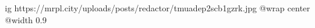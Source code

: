  
 
 
 
 

\ifcmt
  ig https://mrpl.city/uploads/posts/redactor/tmuadep2scb1gzrk.jpg
  @wrap center
  @width 0.9
\fi
